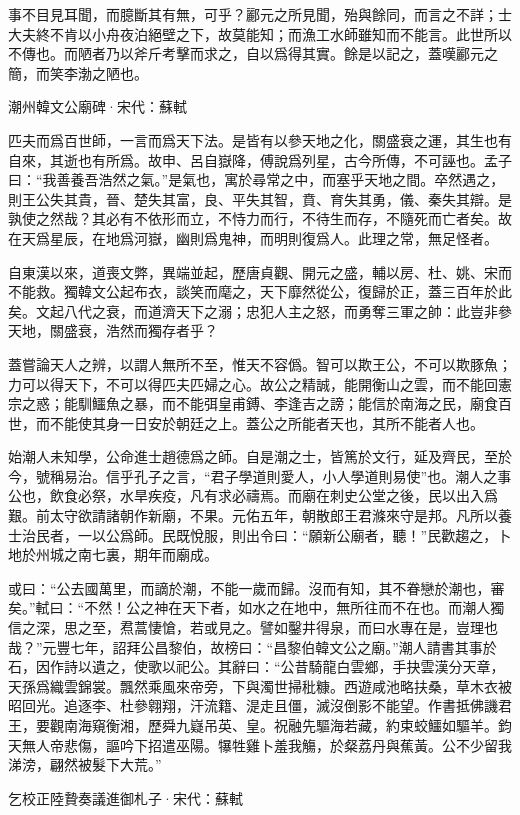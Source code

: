 \documentclass[12pt,a4paper]{ctexbook}
\begin{document}
事不目見耳聞，而臆斷其有無，可乎？酈元之所見聞，殆與餘同，而言之不詳；士大夫終不肯以小舟夜泊絕壁之下，故莫能知；而漁工水師雖知而不能言。此世所以不傳也。而陋者乃以斧斤考擊而求之，自以爲得其實。餘是以記之，蓋嘆酈元之簡，而笑李渤之陋也。\par
潮州韓文公廟碑·宋代：蘇軾 \par
匹夫而爲百世師，一言而爲天下法。是皆有以參天地之化，關盛衰之運，其生也有自來，其逝也有所爲。故申、呂自嶽降，傅說爲列星，古今所傳，不可誣也。孟子曰：“我善養吾浩然之氣。”是氣也，寓於尋常之中，而塞乎天地之間。卒然遇之，則王公失其貴，晉、楚失其富，良、平失其智，賁、育失其勇，儀、秦失其辯。是孰使之然哉？其必有不依形而立，不恃力而行，不待生而存，不隨死而亡者矣。故在天爲星辰，在地爲河嶽，幽則爲鬼神，而明則復爲人。此理之常，無足怪者。\par
自東漢以來，道喪文弊，異端並起，歷唐貞觀、開元之盛，輔以房、杜、姚、宋而不能救。獨韓文公起布衣，談笑而麾之，天下靡然從公，復歸於正，蓋三百年於此矣。文起八代之衰，而道濟天下之溺；忠犯人主之怒，而勇奪三軍之帥：此豈非參天地，關盛衰，浩然而獨存者乎？\par
蓋嘗論天人之辨，以謂人無所不至，惟天不容僞。智可以欺王公，不可以欺豚魚；力可以得天下，不可以得匹夫匹婦之心。故公之精誠，能開衡山之雲，而不能回憲宗之惑；能馴鱷魚之暴，而不能弭皇甫鎛、李逢吉之謗；能信於南海之民，廟食百世，而不能使其身一日安於朝廷之上。蓋公之所能者天也，其所不能者人也。\par
始潮人未知學，公命進士趙德爲之師。自是潮之士，皆篤於文行，延及齊民，至於今，號稱易治。信乎孔子之言，“君子學道則愛人，小人學道則易使”也。潮人之事公也，飲食必祭，水旱疾疫，凡有求必禱焉。而廟在刺史公堂之後，民以出入爲艱。前太守欲請諸朝作新廟，不果。元佑五年，朝散郎王君滌來守是邦。凡所以養士治民者，一以公爲師。民既悅服，則出令曰：“願新公廟者，聽！”民歡趨之，卜地於州城之南七裏，期年而廟成。\par
或曰：“公去國萬里，而謫於潮，不能一歲而歸。沒而有知，其不眷戀於潮也，審矣。”軾曰：“不然！公之神在天下者，如水之在地中，無所往而不在也。而潮人獨信之深，思之至，焄蒿悽愴，若或見之。譬如鑿井得泉，而曰水專在是，豈理也哉？”元豐七年，詔拜公昌黎伯，故榜曰：“昌黎伯韓文公之廟。”潮人請書其事於石，因作詩以遺之，使歌以祀公。其辭曰：“公昔騎龍白雲鄉，手抉雲漢分天章，天孫爲織雲錦裳。飄然乘風來帝旁，下與濁世掃秕糠。西遊咸池略扶桑，草木衣被昭回光。追逐李、杜參翱翔，汗流籍、湜走且僵，滅沒倒影不能望。作書抵佛譏君王，要觀南海窺衡湘，歷舜九嶷吊英、皇。祝融先驅海若藏，約束蛟鱷如驅羊。鈞天無人帝悲傷，謳吟下招遣巫陽。犦牲雞卜羞我觴，於粲荔丹與蕉黃。公不少留我涕滂，翩然被髮下大荒。”\par
乞校正陸贄奏議進御札子·宋代：蘇軾 \par
\end{document}
